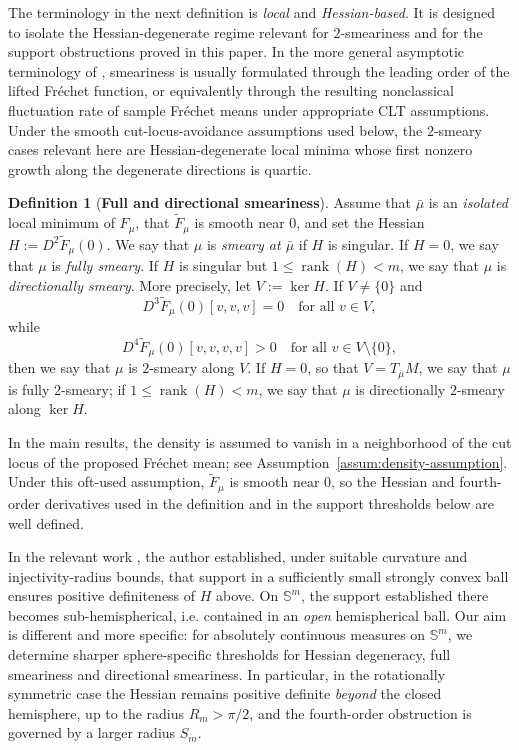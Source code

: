 \documentclass{amsart}
\theoremstyle{definition}
\newtheorem{definition}[theorem]{Definition}
\theoremstyle{remark}
\newcommand{\mubar}{\bar{\mu}}
\newcommand\0{\boldsymbol{0}}
\begin{document}
The terminology in the next definition is \textit{local} and \textit{Hessian-based}. It is designed to isolate the Hessian-degenerate regime relevant for \(2\)-smeariness and for the support obstructions proved in this paper. In the more general asymptotic terminology of \citet{HotzHuckemann2015,HE,Eltzner2022GeometricalSmeariness}, smeariness is usually formulated through the leading order of the lifted Fr\'echet function, or equivalently through the resulting nonclassical fluctuation rate of sample Fr\'echet means under appropriate CLT assumptions. Under the smooth cut-locus-avoidance assumptions used below, the \(2\)-smeary cases relevant here are Hessian-degenerate local minima whose first nonzero growth along the degenerate directions is quartic.

\begin{definition}[{\textbf{Full and directional smeariness}}]\label{def:smeariness-directional}
Assume that \(\mubar\) is an \textit{isolated} local minimum of \(F_\mu\), that \(\widetilde F_\mu\) is smooth near \(0\), and set the Hessian \(H:=D^2\widetilde F_\mu(0)\).  We say that \(\mu\) is \emph{smeary at \(\mubar\)} if \(H\) is singular.  If \(H=0\), we say that \(\mu\) is \emph{fully smeary}.  If \(H\) is singular but \(1\le \operatorname{rank}(H)<m\), we say that \(\mu\) is \emph{directionally smeary}.  More precisely, let \(V:=\ker H\). If \(V\neq\{0\}\) and
\[
    D^3\widetilde F_\mu(0)[v,v,v]=0
    \quad\text{for all }v\in V,
\]
while
\[
    D^4\widetilde F_\mu(0)[v,v,v,v]>0
    \quad\text{for all }v\in V\setminus\{0\},
\]
then we say that \(\mu\) is \(2\)-smeary along \(V\). If \(H=0\), so that
\(V=T_{\mubar}M\), we say that \(\mu\) is fully \(2\)-smeary; if
\(1\le\operatorname{rank}(H)<m\), we say that \(\mu\) is directionally
\(2\)-smeary along \(\ker H\). 
\end{definition}

In the main results, the density is assumed to vanish in a neighborhood of the cut locus of the proposed Fr\'echet mean; see Assumption~\ref{assum:density-assumption}.  Under this oft-used assumption, \(\widetilde F_\mu\) is smooth near \(0\), so the Hessian and fourth-order derivatives used in the definition and in the support thresholds below are well defined.

In the relevant work \citet{afsari2011riemannianLp}, the author established, under suitable curvature and injectivity-radius bounds, that support in a sufficiently small strongly convex ball ensures positive definiteness of $H$ above.  On $\mathbb{S}^m$, the support established there becomes sub-hemispherical, i.e. contained in an \textit{open} hemispherical ball. Our aim is different and more specific: for absolutely continuous measures on \(\mathbb S^m\), we determine sharper sphere-specific thresholds for Hessian degeneracy, full smeariness and directional smeariness.  In particular, in the rotationally symmetric case the Hessian remains positive definite \textit{beyond} the closed hemisphere, up to the radius \(R_m>\pi/2\), and the fourth-order obstruction is governed by a larger radius \(S_m\).
\end{document}
